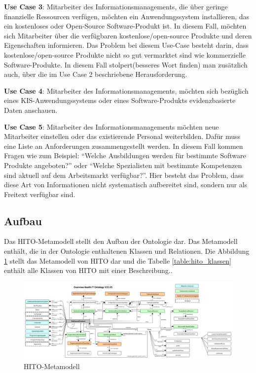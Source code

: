 \textbf{Use Case 3}: Mitarbeiter des Informationsmanagements, die über geringe finanzielle Ressourcen verfügen, möchten ein Anwendungssystem installieren, das ein kostenloses oder Open-Source Software-Produkt ist.
In diesem Fall, möchten sich Mitarbeiter über die verfügbaren kostenlose/open-source Produkte und deren Eigenschaften informieren.
Das Problem bei diesem Use-Case besteht darin, dass kostenlose/open-source Produkte nicht so gut vermarktet sind wie kommerzielle Software-Produkte. 
In diesem Fall stolpert(besseres Wort finden) man zusätzlich auch, über die im Use Case 2 beschriebene Herausforderung. \newline

\textbf{Use Case 4}: Mitarbeiter des Informationsmanagements, möchten sich bezüglich eines KIS-Anwendungssystems oder eines Software-Produkts evidenzbasierte Daten anschauen.  \newline

\textbf{Use Case 5}: Mitarbeiter des Informationsmanagements möchten neue Mitarbeiter einstellen oder das existierende Personal weiterbilden.
Dafür muss eine Liste an Anforderungen zusammengestellt werden.
In diesem Fall kommen Fragen wie zum Beispiel: \enquote{Welche Ausbildungen werden für bestimmte Software Produkte angeboten?} oder \enquote{Welche Spezialisten mit bestimmte Kompetenzen sind aktuell auf dem Arbeitsmarkt verfügbar?}.
Hier besteht das Problem, dass diese Art von Informationen nicht systematisch aufbereitet sind, sondern nur als Freitext verfügbar sind.\newline

\subsection{Aufbau}

Das \ac{HITO}-Metamodell stellt den Aufbau der Ontologie dar. 
Das Metamodell enthält, die in der Ontologie enthaltenen Klassen und Relationen.
Die Abbildung \ref{fig:metamodel} stellt das Metamodell von HITO dar und die Tabelle \ref{table:hito_klassen} enthält alle Klassen von HITO mit einer Beschreibung.. 

\begin{figure}
    	\includegraphics[width=\textwidth]{Images/hito_metamodell}
   	\caption{HITO-Metamodell}
   	\label{fig:metamodel}
\end{figure}

